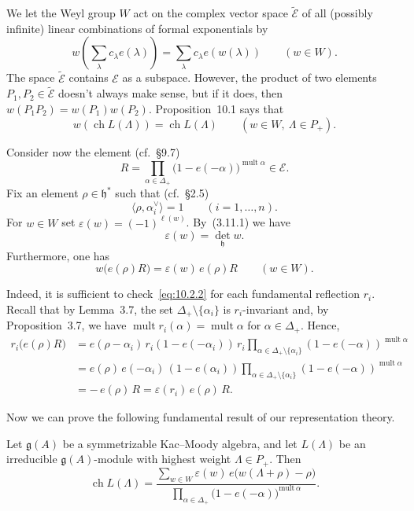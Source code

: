 \documentclass[12pt]{article}
\begin{document}
We let the Weyl group $W$ act on the complex vector space $\widetilde{\mathcal{E}}$
of all (possibly infinite) linear combinations of formal exponentials by
\[
w\!\left( \sum_{\lambda} c_\lambda e(\lambda) \right)
= \sum_{\lambda} c_\lambda e(w(\lambda))
\qquad (w \in W).
\]
The space $\widetilde{\mathcal{E}}$ contains $\mathcal{E}$ as a subspace.
However, the product of two elements $P_1, P_2 \in \widetilde{\mathcal{E}}$
doesn't always make sense, but if it does, then
$w(P_1 P_2) = w(P_1) w(P_2)$.
Proposition~10.1 says that
\begin{equation}\label{eq:10.2.1}
w(\operatorname{ch} L(\Lambda)) = \operatorname{ch} L(\Lambda)
\qquad (w \in W,\ \Lambda \in P_+).
\end{equation}

Consider now the element (cf.\ \S9.7)
\[
R = \prod_{\alpha \in \Delta_+} \bigl(1 - e(-\alpha)\bigr)^{\operatorname{mult}\alpha}
\in \mathcal{E}.
\]
Fix an element $\rho \in \mathfrak{h}^*$ such that (cf.\ \S2.5)
\[
\langle \rho, \alpha_i^\vee \rangle = 1 \qquad (i=1,\dots,n).
\]
For $w \in W$ set $\varepsilon(w) = (-1)^{\ell(w)}$.
By~(3.11.1) we have
\[
\varepsilon(w) = \det_{\mathfrak{h}} w.
\]
Furthermore, one has
\begin{equation}\label{eq:10.2.2}
w\bigl(e(\rho)R\bigr) = \varepsilon(w)\, e(\rho)R
\qquad (w \in W).
\end{equation}

Indeed, it is sufficient to check~\eqref{eq:10.2.2}
for each fundamental reflection $r_i$.
Recall that by Lemma~3.7, the set
$\Delta_+ \setminus \{\alpha_i\}$ is $r_i$-invariant and, by
Proposition~3.7, we have $\operatorname{mult} r_i(\alpha)
= \operatorname{mult}\alpha$ for $\alpha \in \Delta_+$.
Hence,
\[
\begin{aligned}
r_i\bigl(e(\rho)R\bigr)
&= e(\rho - \alpha_i)\, r_i(1 - e(-\alpha_i))\, r_i
  \!\!\prod_{\alpha \in \Delta_+ \setminus \{\alpha_i\}}\!
  (1 - e(-\alpha))^{\operatorname{mult}\alpha} \\[4pt]
&= e(\rho)\, e(-\alpha_i)\, (1 - e(\alpha_i))
  \!\!\prod_{\alpha \in \Delta_+ \setminus \{\alpha_i\}}\!
  (1 - e(-\alpha))^{\operatorname{mult}\alpha} \\[4pt]
&= -\, e(\rho)\, R
= \varepsilon(r_i)\, e(\rho)\, R.
\end{aligned}
\]

Now we can prove the following fundamental result of our representation theory.
\begin{theorem}
Let $\mathfrak{g}(A)$ be a symmetrizable Kac--Moody algebra, and
let $L(\Lambda)$ be an irreducible $\mathfrak{g}(A)$-module with highest weight
$\Lambda \in P_+$. Then
\begin{equation}\label{eq:10.4.1}
\operatorname{ch} L(\Lambda)
= \frac{\displaystyle \sum_{w \in W} \varepsilon(w)\, e\bigl(w(\Lambda+\rho)-\rho\bigr)}
{\displaystyle \prod_{\alpha \in \Delta_+} \bigl(1 - e(-\alpha)\bigr)^{\mathrm{mult}\,\alpha}}.
\end{equation}
\end{theorem}
\end{document}
